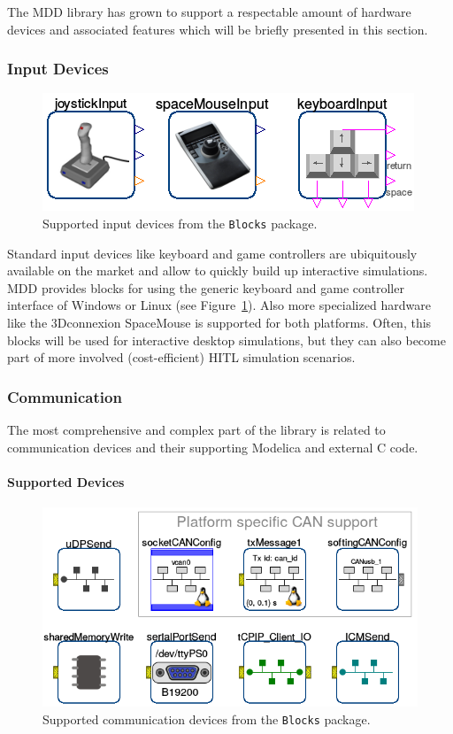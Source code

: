 \documentclass{resources/modelica}
\newcommand{\modelica}[1]{\lstinline[language=modelica]|#1|}
\begin{document}
The MDD library has grown to support a respectable amount of hardware devices
and associated features which will be briefly presented in this section.

\subsubsection{Input Devices}

\begin{figure}[htb]
  \centering
  \includegraphics[width=0.7\columnwidth]{figures/OverviewInputDevices}
  \caption{Supported input devices from the \modelica{Blocks} package.}
  \label{fig:OverviewInputDevices}
\end{figure}

Standard input devices like keyboard and game controllers are ubiquitously
available on the market and allow to quickly build up interactive simulations.
MDD provides blocks for using the generic keyboard and game controller interface
of Windows or Linux (see Figure~\ref{fig:OverviewInputDevices}). Also more
specialized hardware like the 3Dconnexion SpaceMouse is supported for both platforms.
Often, this blocks will be used for interactive desktop simulations, but they
can also become part of more involved (cost-efficient) HITL simulation
scenarios.

\subsubsection{Communication}

The most comprehensive and complex part of the library is related to
communication devices and their supporting Modelica and external C code.

\paragraph{Supported Devices}

\begin{figure}[htb]
  \centering
  \includegraphics[width=0.9\columnwidth]{figures/OverviewCommunicationDevices}
  \caption{Supported communication devices from the \modelica{Blocks} package.}
  \label{fig:OverviewCommunicationDevices}
\end{figure}
\end{document}

